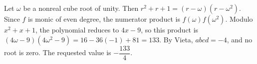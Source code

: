 Let $\omega$ be a nonreal cube root of unity. Then $r^2+r+1=(r-\omega)(r-\omega^2)$. Since $f$ is monic of even degree, the numerator product is $f(\omega)f(\omega^2)$. Modulo $x^2+x+1$, the polynomial reduces to $4x-9$, so this product is $(4\omega-9)(4\omega^2-9)=16-36(-1)+81=133$. By Vieta, $abcd=-4$, and no root is zero. The requested value is $\boxed{-\dfrac{133}{4}}$.
